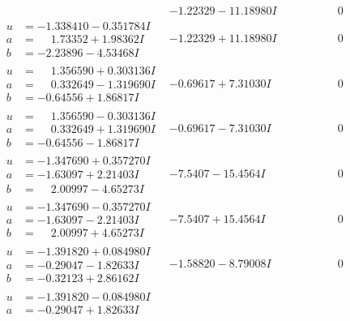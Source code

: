\documentclass[1p]{elsarticle_modified}
\theoremstyle{definition}
\begin{document}
$$\begin{array}{c|c|c}
 & -1.22329 - 11.18980 I & \phantom{-0.000000 } 0 \\ \hline\begin{aligned}
u &= -1.338410 - 0.351784 I \\
a &= \phantom{-}1.73352 + 1.98362 I \\
b &= -2.23896 - 4.53468 I\end{aligned}
 & -1.22329 + 11.18980 I & \phantom{-0.000000 } 0 \\ \hline\begin{aligned}
u &= \phantom{-}1.356590 + 0.303136 I \\
a &= \phantom{-}0.332649 - 1.319690 I \\
b &= -0.64556 + 1.86817 I\end{aligned}
 & -0.69617 + 7.31030 I & \phantom{-0.000000 } 0 \\ \hline\begin{aligned}
u &= \phantom{-}1.356590 - 0.303136 I \\
a &= \phantom{-}0.332649 + 1.319690 I \\
b &= -0.64556 - 1.86817 I\end{aligned}
 & -0.69617 - 7.31030 I & \phantom{-0.000000 } 0 \\ \hline\begin{aligned}
u &= -1.347690 + 0.357270 I \\
a &= -1.63097 + 2.21403 I \\
b &= \phantom{-}2.00997 - 4.65273 I\end{aligned}
 & -7.5407 - 15.4564 I & \phantom{-0.000000 } 0 \\ \hline\begin{aligned}
u &= -1.347690 - 0.357270 I \\
a &= -1.63097 - 2.21403 I \\
b &= \phantom{-}2.00997 + 4.65273 I\end{aligned}
 & -7.5407 + 15.4564 I & \phantom{-0.000000 } 0 \\ \hline\begin{aligned}
u &= -1.391820 + 0.084980 I \\
a &= -0.29047 - 1.82633 I \\
b &= -0.32123 + 2.86162 I\end{aligned}
 & -1.58820 - 8.79008 I & \phantom{-0.000000 } 0 \\ \hline\begin{aligned}
u &= -1.391820 - 0.084980 I \\
a &= -0.29047 + 1.82633 I \\

\end{aligned}
\end{array}$$
\end{document}
